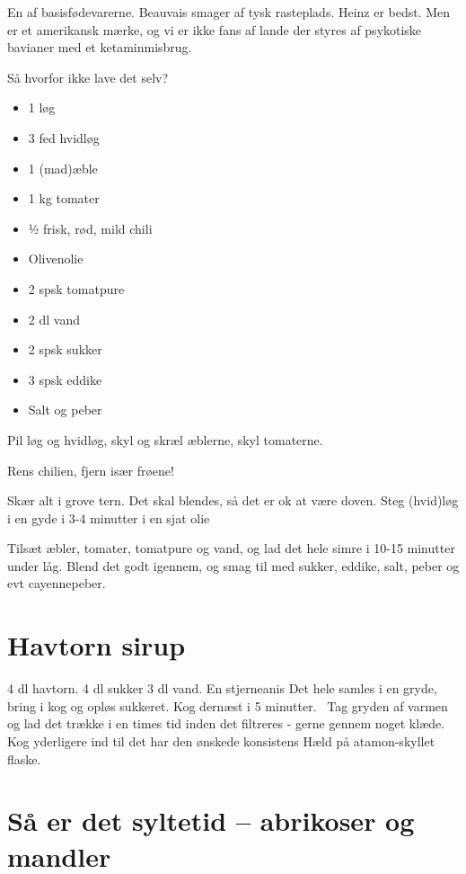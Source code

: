 \documentclass[
  letterpaper,
  DIV=11,
  numbers=noendperiod]{scrreprt}
\providecommand{\tightlist}{%
  \setlength{\itemsep}{0pt}\setlength{\parskip}{0pt}}\usepackage{longtable,booktabs,array}
\begin{document}
En af basisfødevarerne. Beauvais smager af tysk rasteplads. Heinz er
bedst. Men er et amerikansk mærke, og vi er ikke fans af lande der
styres af psykotiske bavianer med et ketaminmisbrug.

Så hvorfor ikke lave det selv?

\begin{itemize}
\tightlist
\item
  1 løg
\item
  3 fed hvidløg
\item
  1 (mad)æble
\item
  1 kg tomater
\item
  ½ frisk, rød, mild chili
\item
  Olivenolie
\item
  2 spsk tomatpure
\item
  2 dl vand
\item
  2 spsk sukker
\item
  3 spsk eddike
\item
  Salt og peber
\end{itemize}

Pil løg og hvidløg, skyl og skræl æblerne, skyl tomaterne.

Rens chilien, fjern især frøene!

Skær alt i grove tern. Det skal blendes, så det er ok at være doven.
Steg (hvid)løg i en gyde i 3-4 minutter i en sjat olie

Tilsæt æbler, tomater, tomatpure og vand, og lad det hele simre i 10-15
minutter under låg. Blend det godt igennem, og smag til med sukker,
eddike, salt, peber og evt cayennepeber.

\hypertarget{havtorn-sirup}{%
\section{Havtorn sirup}\label{havtorn-sirup}}

4 dl havtorn. 4 dl sukker 3 dl vand. En stjerneanis Det hele samles i en
gryde, bring i kog og opløs sukkeret. Kog dernæst i 5 minutter.~ Tag
gryden af varmen og lad det trække i en times tid inden det filtreres -
gerne gennem noget klæde.~ Kog yderligere ind til det har den ønskede
konsistens Hæld på atamon-skyllet flaske.

\hypertarget{suxe5-er-det-syltetid-abrikoser-og-mandler}{%
\section{Så er det syltetid -- abrikoser og
mandler}\label{suxe5-er-det-syltetid-abrikoser-og-mandler}}
\end{document}
